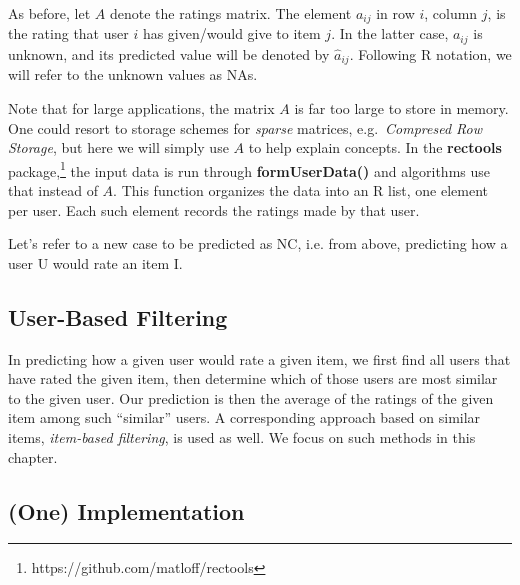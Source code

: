 As before, let $A$ denote the ratings matrix.  The element $a_{ij}$ in
row $i$, column $j$, is the rating that user $i$ has given/would give to
item $j$. In the latter case, $a_{ij}$ is unknown, and its predicted value
will be denoted by $\widehat{a}_{ij}$.  Following R notation, we will
refer to the unknown values as NAs.

Note that for large applications, the matrix $A$ is far too large to
store in memory.  One could resort to storage schemes for
\textit{sparse} matrices, e.g.\ \textit{Compresed Row Storage}, but here
we will simply use $A$ to help explain concepts.  In the
\textbf{rectools} package,\footnote{https://github.com/matloff/rectools}
the input data is run through
\textbf{formUserData()} and algorithms use that instead of $A$.  This
function organizes the data into an R list, one element per user.  Each
such element records the ratings made by that user. 

Let's refer to a new case to be predicted as NC, i.e. from above,
predicting how a user U would rate an item I.

\subsection{User-Based Filtering}

In predicting how a given user would rate a given item, we first find
all users that have rated the given item, then determine which of those
users are most similar to the given user.  Our prediction is then the
average of the ratings of the given item among such ``similar'' users.
A corresponding approach based on similar items, \textit{item-based
filtering}, is used as well.  We focus on such methods in this chapter.

% 

\subsection{(One) Implementation}

